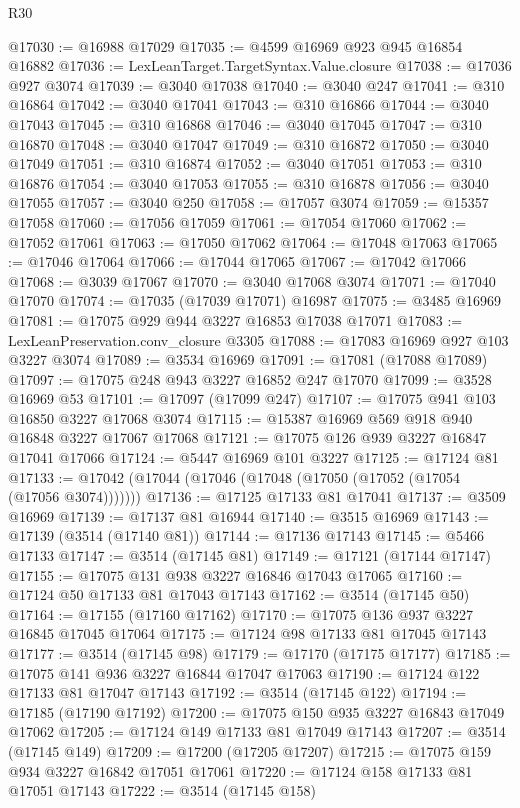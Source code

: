 \begin{lexlean}{R30}
\begin{coremodule}
@17030 := @16988 @17029
@17035 := @4599 @16969 @923 @945 @16854 @16882
@17036 := LexLeanTarget.TargetSyntax.Value.closure
@17038 := @17036 @927 @3074
@17039 := @3040 @17038
@17040 := @3040 @247
@17041 := @310 @16864
@17042 := @3040 @17041
@17043 := @310 @16866
@17044 := @3040 @17043
@17045 := @310 @16868
@17046 := @3040 @17045
@17047 := @310 @16870
@17048 := @3040 @17047
@17049 := @310 @16872
@17050 := @3040 @17049
@17051 := @310 @16874
@17052 := @3040 @17051
@17053 := @310 @16876
@17054 := @3040 @17053
@17055 := @310 @16878
@17056 := @3040 @17055
@17057 := @3040 @250
@17058 := @17057 @3074
@17059 := @15357 @17058
@17060 := @17056 @17059
@17061 := @17054 @17060
@17062 := @17052 @17061
@17063 := @17050 @17062
@17064 := @17048 @17063
@17065 := @17046 @17064
@17066 := @17044 @17065
@17067 := @17042 @17066
@17068 := @3039 @17067
@17070 := @3040 @17068 @3074
@17071 := @17040 @17070
@17074 := @17035 (@17039 @17071) @16987
@17075 := @3485 @16969
@17081 := @17075 @929 @944 @3227 @16853 @17038 @17071
@17083 := LexLeanPreservation.conv_closure @3305
@17088 := @17083 @16969 @927 @103 @3227 @3074
@17089 := @3534 @16969
@17091 := @17081 (@17088 @17089)
@17097 := @17075 @248 @943 @3227 @16852 @247 @17070
@17099 := @3528 @16969 @53
@17101 := @17097 (@17099 @247)
@17107 := @17075 @941 @103 @16850 @3227 @17068 @3074
@17115 := @15387 @16969 @569 @918 @940 @16848 @3227 @17067 @17068
@17121 := @17075 @126 @939 @3227 @16847 @17041 @17066
@17124 := @5447 @16969 @101 @3227
@17125 := @17124 @81
@17133 := @17042 (@17044 (@17046 (@17048 (@17050 (@17052 (@17054 (@17056 @3074)))))))
@17136 := @17125 @17133 @81 @17041
@17137 := @3509 @16969
@17139 := @17137 @81 @16944
@17140 := @3515 @16969
@17143 := @17139 (@3514 (@17140 @81))
@17144 := @17136 @17143
@17145 := @5466 @17133
@17147 := @3514 (@17145 @81)
@17149 := @17121 (@17144 @17147)
@17155 := @17075 @131 @938 @3227 @16846 @17043 @17065
@17160 := @17124 @50 @17133 @81 @17043 @17143
@17162 := @3514 (@17145 @50)
@17164 := @17155 (@17160 @17162)
@17170 := @17075 @136 @937 @3227 @16845 @17045 @17064
@17175 := @17124 @98 @17133 @81 @17045 @17143
@17177 := @3514 (@17145 @98)
@17179 := @17170 (@17175 @17177)
@17185 := @17075 @141 @936 @3227 @16844 @17047 @17063
@17190 := @17124 @122 @17133 @81 @17047 @17143
@17192 := @3514 (@17145 @122)
@17194 := @17185 (@17190 @17192)
@17200 := @17075 @150 @935 @3227 @16843 @17049 @17062
@17205 := @17124 @149 @17133 @81 @17049 @17143
@17207 := @3514 (@17145 @149)
@17209 := @17200 (@17205 @17207)
@17215 := @17075 @159 @934 @3227 @16842 @17051 @17061
@17220 := @17124 @158 @17133 @81 @17051 @17143
@17222 := @3514 (@17145 @158)

\end{coremodule}
\end{lexlean}
